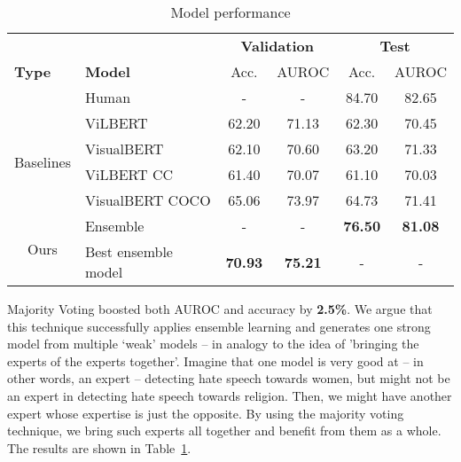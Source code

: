 \documentclass{article}
\begin{document}
\begin{table}
  \caption{Model performance}
  \label{table:model}
  \centering
  \begin{tabular}{ll|cc|cc}
    \toprule
                                               &                 & \multicolumn{2}{c|}{\textbf{Validation}} & \multicolumn{2}{c}{\textbf{Test}}  \\
\textbf{Type}                                  & \textbf{Model}  & Acc.                & AUROC              & Acc.             & AUROC           \\
    \midrule
                                               & Human           & -                   & -                  & 84.70            & 82.65           \\
    \midrule
\multicolumn{1}{c}{\multirow{4}{*}{Baselines}} & ViLBERT         & 62.20               & 71.13              & 62.30            & 70.45           \\
\multicolumn{1}{c}{}                           & VisualBERT      & 62.10               & 70.60              & 63.20            & 71.33           \\
\multicolumn{1}{c}{}                           & ViLBERT CC      & 61.40               & 70.07              & 61.10            & 70.03           \\
\multicolumn{1}{c}{}                           & VisualBERT COCO & 65.06               & 73.97              & 64.73            & 71.41           \\
    \midrule
\multicolumn{1}{c}{\multirow{2}{*}{Ours}}      & Ensemble        & -                   & -                  & \textbf{76.50}   & \textbf{81.08}  \\
\multicolumn{1}{c}{}                           & Best ensemble model& \textbf{70.93}   & \textbf{75.21}     & -                & -               \\
    \bottomrule
  \end{tabular}
\end{table}


  Majority Voting boosted both AUROC and accuracy by \textbf{2.5\%}. We argue that this technique successfully applies ensemble learning and generates one strong model from multiple ‘weak’ models -- in analogy to the idea of 'bringing the experts of the experts together'. Imagine that one model is very good at -- in other words, an expert -- detecting hate speech towards women, but might not be an expert in detecting hate speech towards religion. Then, we might have another expert whose expertise is just the opposite. By using the majority voting technique, we bring such experts all together and benefit from them as a whole. The results are shown in Table~\ref{table:model}.
\end{document}
